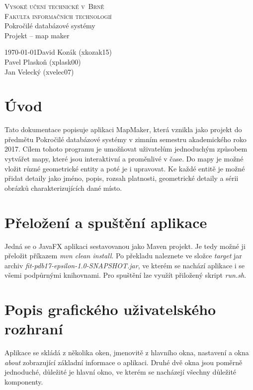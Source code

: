 \documentclass[12pt,a4paper,titlepage]{article}
\begin{document}
\begin{titlepage}
\begin{center}
    {
    	\Huge\textsc{Vysoké učení technické v~Brně}}\\
    \smallskip
    {
    	\huge\textsc{Fakulta informačních technologií}}\\
    \bigskip
    \huge{Pokročilé databázové systémy}\\
    \smallskip
    \Huge{Projekt -- map maker}\\
\end{center}
    {\Large \today \hfill David Kozák (xkozak15)  }\\
    \smallskip
    {\Large \hfill Pavel Plaskoň (xplask00)  }\\
    \smallskip
    {\Large \hfill Jan Velecký (xvelec07)  }\\
\end{titlepage}

\newpage
\tableofcontents
\newpage

\section{Úvod}
Tato dokumentace popisuje aplikaci MapMaker, která vznikla jako projekt do předmětu Pokročilé databázové systémy v zimním semestru akademického roko 2017. Cílem tohoto programu je umožňovat uživatelům jednoduchým způsobem vytvářet mapy, které jsou interaktivní a proměnlivé v čase. Do mapy je možné vložit různé geometrické entity a poté je i upravovat. Ke každé entitě je možné přidat detaily jako jméno, popis, rozsah platnosti, geometrické detaily a sérii obrázků charakterizujících dané místo.

\section{Přeložení a spuštění aplikace}
Jedná se o JavaFX aplikaci sestavovanou jako Maven projekt. Je tedy možné ji přeložit příkazem \textit{mvn clean install}. Po překladu naleznete ve složce \textit{target} jar archiv \textit{fit-pdb17-epsilon-1.0-SNAPSHOT.jar}, ve kterém se nachází aplikace i se všemi podpůrnými knihovnami. Pro spuštění lze využít přiložený skript \textit{run.sh}. 

\section{Popis grafického uživatelského rozhraní}
Aplikace se skládá z několika oken, jmenovitě z hlavního okna, nastavení a okna \textit{about} zobrazující základní informace o aplikaci. Druhé dvě okna jsou poměrně jednoduché, důležité je hlavní okno, ve kterém se nacházejí všechny důležité komponenty. 
\end{document}
